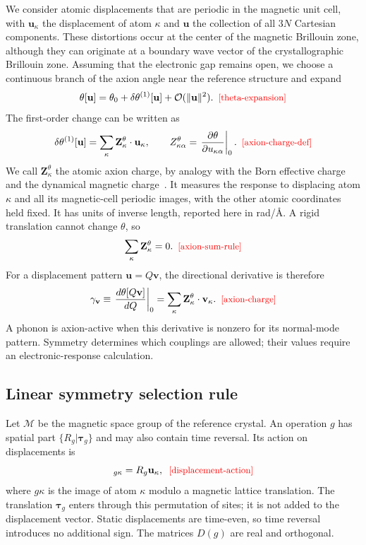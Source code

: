 \documentclass[galley,aps,pra,10pt,amsmath,amssymb,
    superscriptaddress,nofootinbib,longbibliography]{revtex4-2}
\def\Red#1{\textcolor{red}{#1}}
\newcounter{comm}
\newcommand{\seclab}[1]{\label{sec:#1}{\Red{\small\;\;[sec:~#1]}}}
\newcommand{\eqlab}[1]{\Red{\hbox{\small\;\;[#1]}}\label{eq:#1}}
\newcommand{\eqlab}[1]{\label{eq:#1}}
\newcommand{\seclab}[1]{\label{sec:#1}}
\begin{document}
We consider atomic displacements that are periodic in the magnetic unit cell, with $\mathbf u_\kappa$ the displacement of atom $\kappa$ and $\mathbf u$ the collection of all $3N$ Cartesian components. These distortions occur at the center of the magnetic Brillouin zone, although they can originate at a boundary wave vector of the crystallographic Brillouin zone. Assuming that the electronic gap remains open, we choose a continuous branch of the axion angle near the reference structure and expand
\begin{equation}
\theta[\mathbf u]=\theta_0+
\delta\theta^{(1)}[\mathbf u]+\mathcal O(\|\mathbf u\|^2).
\eqlab{theta-expansion}
\end{equation}
The first-order change can be written as
\begin{equation}
\delta\theta^{(1)}[\mathbf u]
=\sum_\kappa\mathbf Z^\theta_\kappa\cdot\mathbf u_\kappa,
\qquad
Z^\theta_{\kappa\alpha}
=\left.\frac{\partial\theta}{\partial u_{\kappa\alpha}}\right|_0.
\eqlab{axion-charge-def}
\end{equation}
We call $\mathbf Z^\theta_\kappa$ the atomic axion charge, by analogy with the Born effective charge and the dynamical magnetic charge~\cite{ye2014dynamical}. It measures the response to displacing atom $\kappa$ and all its magnetic-cell periodic images, with the other atomic coordinates held fixed. It has units of inverse length, reported here in rad/\AA. A rigid translation cannot change $\theta$, so
\begin{equation}
\sum_\kappa\mathbf Z^\theta_\kappa=0.
\eqlab{axion-sum-rule}
\end{equation}
For a displacement pattern $\mathbf u=Q\mathbf v$, the directional derivative is therefore
\begin{equation}
\gamma_{\mathbf v}
\equiv\left.\frac{d\theta[Q\mathbf v]}{dQ}\right|_0
=\sum_\kappa\mathbf Z^\theta_\kappa\cdot\mathbf v_\kappa.
\eqlab{axion-charge}
\end{equation}
A phonon is axion-active when this derivative is nonzero for its normal-mode pattern. Symmetry determines which couplings are allowed; their values require an electronic-response calculation.

\subsection{Linear symmetry selection rule}
\seclab{selection-rule}

Let $\mathcal M$ be the magnetic space group of the reference crystal. An operation $g$ has spatial part $\{R_g|\boldsymbol\tau_g\}$ and may also contain time reversal. Its action on displacements is
\begin{equation}
[D(g)\mathbf u]_{g\kappa}=R_g\mathbf u_\kappa,
\eqlab{displacement-action}
\end{equation}
where $g\kappa$ is the image of atom $\kappa$ modulo a magnetic lattice translation. The translation $\boldsymbol\tau_g$ enters through this permutation of sites; it is not added to the displacement vector. Static displacements are time-even, so time reversal introduces no additional sign. The matrices $D(g)$ are real and orthogonal.
\end{document}

